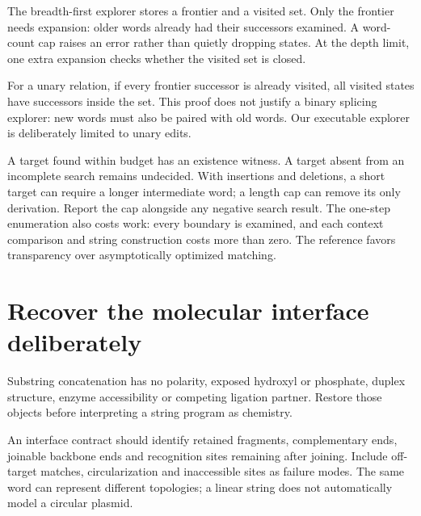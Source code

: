 The breadth-first explorer stores a frontier and a visited set. Only the
frontier needs expansion: older words already had their successors examined.
A word-count cap raises an error rather than quietly dropping states.
At the depth limit, one extra expansion checks whether the visited set is closed.
\begin{center}\end{center}

For a unary relation, if every frontier successor is already visited, all
visited states have successors inside the set. This proof does not justify
a binary splicing explorer: new words must also be paired with old words.
Our executable explorer is deliberately limited to unary edits.

A target found within budget has an existence witness. A target absent
from an incomplete search remains undecided. With insertions and deletions,
a short target can require a longer intermediate word; a length cap can remove
its only derivation. Report the cap alongside any negative search result.
The one-step enumeration also costs work: every boundary is examined,
and each context comparison and string construction costs more than zero.
The reference favors transparency over asymptotically optimized matching.

\section{Recover the molecular interface deliberately}\label{sec:interface}
Substring concatenation has no polarity, exposed hydroxyl or phosphate, duplex
structure, enzyme accessibility or competing ligation partner. Restore those
objects before interpreting a string program as chemistry.

An interface contract should identify retained fragments, complementary ends,
joinable backbone ends and recognition sites remaining after joining. Include
off-target matches, circularization and inaccessible sites as failure modes.
The same word can represent different topologies; a linear string does not
automatically model a circular plasmid.

